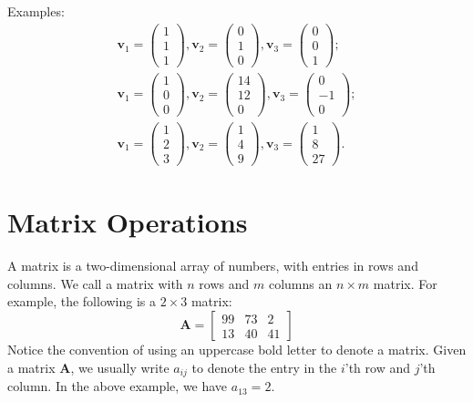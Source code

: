 \documentclass[12pt,oneside,openany]{book}
\begin{document}
Examples: \[
\begin{gathered}
\mathbf{v}_1 = \begin{pmatrix} 1 \\ 1 \\ 1 \end{pmatrix},
\mathbf{v}_2 = \begin{pmatrix} 0 \\ 1 \\ 0 \end{pmatrix},
\mathbf{v}_3 = \begin{pmatrix} 0 \\ 0 \\ 1 \end{pmatrix}; \\
\mathbf{v}_1 = \begin{pmatrix} 1 \\ 0 \\ 0 \end{pmatrix},
\mathbf{v}_2 = \begin{pmatrix} 14 \\ 12 \\ 0 \end{pmatrix},
\mathbf{v}_3 = \begin{pmatrix} 0 \\ -1 \\ 0 \end{pmatrix}; \\
\mathbf{v}_1 = \begin{pmatrix} 1 \\ 2 \\ 3 \end{pmatrix},
\mathbf{v}_2 = \begin{pmatrix} 1 \\ 4 \\ 9 \end{pmatrix},
\mathbf{v}_3 = \begin{pmatrix} 1 \\ 8 \\ 27 \end{pmatrix}.
\end{gathered}
\]

\section{Matrix Operations}\label{matrix-operations}

A matrix is a two-dimensional array of numbers, with entries in rows and
columns. We call a matrix with \(n\) rows and \(m\) columns an
\(n \times m\) matrix. For example, the following is a \(2 \times 3\)
matrix: \[
\mathbf{A}
=
\begin{bmatrix}
  99 & 73 & 2 \\
  13 & 40 & 41
\end{bmatrix}
\] Notice the convention of using an uppercase bold letter to denote a
matrix. Given a matrix \(\mathbf{A}\), we usually write \(a_{ij}\) to
denote the entry in the \(i\)'th row and \(j\)'th column. In the above
example, we have \(a_{13} = 2\).
\end{document}
